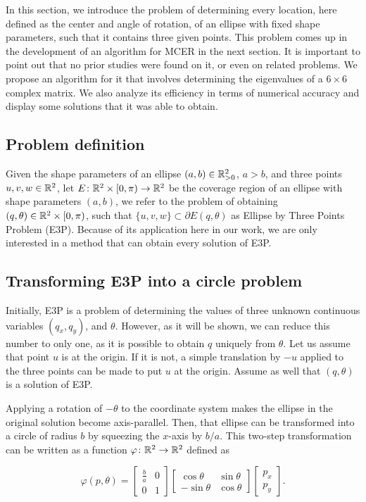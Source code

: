 In this section, we introduce the problem of determining every location, here defined as the center and angle of rotation, of an ellipse with fixed shape parameters, such that it contains three given points.
This problem comes up in the development of an algorithm for MCER in the next section. 
It is important to point out that no prior studies were found on it, or even on related problems.
We propose an algorithm for it that involves determining the eigenvalues of a $6\times6$ complex matrix. We also analyze its efficiency in terms of numerical accuracy and display some solutions that it was able to obtain.

\subsection{Problem definition}

Given the shape parameters of an ellipse $(a, b) \in \mathbb{R}^2_{>0}$, $a > b$, and three points $u, v, w \in \mathbb{R}^2$, let $E\colon \mathbb{R}^2\times [0, \pi)\to\mathbb{R}^2$ be the coverage region of an ellipse with shape parameters $(a, b)$, we refer to the problem of obtaining $(q, \theta) \in \mathbb{R}^2\times [0, \pi)$, such that $\{u, v, w\} \subset \partial E(q, \theta)$ as Ellipse by Three Points Problem (E3P).
Because of its application here in our work, we are only interested in a method that can obtain every solution of E3P.

\subsection{Transforming E3P into a circle problem}

Initially, E3P is a problem of determining the values of three unknown continuous variables $(q_x, q_y)$, and $\theta$. However, as it will be shown, we can reduce this number to only one, as it is possible to obtain $q$ uniquely from $\theta$.
Let us assume that point $u$ is at the origin. If it is not, a simple translation by $-u$ applied to the three points can be made to put $u$ at the origin.
Assume as well that $(q, \theta)$ is a solution of E3P. 

Applying a rotation of $-\theta$ to the coordinate system makes the ellipse in the original solution become axis-parallel.
Then, that ellipse can be transformed into a circle of radius $b$ by squeezing the $x$-axis by $b/a$. This two-step transformation can be written as a function $\varphi\colon \mathbb{R}^2 \to \mathbb{R}^2$ defined as

\begin{equation*}%
\varphi(p, \theta)=\left[\begin{array}{cc}
\frac{b}{a}&0\\
0&1
\end{array}\right]
\left[\begin{array}{cc}
\cos{\theta}&\sin{\theta}\\
-\sin{\theta}&\cos{\theta}
\end{array}\right]\left[\begin{array}{c}
p_x\\
p_y
\end{array}\right].
\end{equation*}


